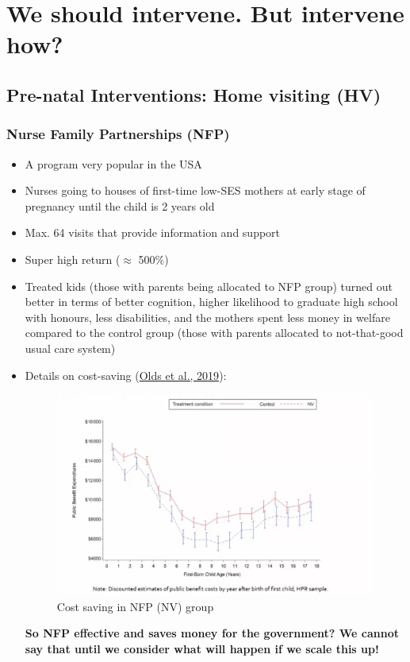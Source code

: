 \section{We should intervene. But intervene how?}

    \subsection{Pre-natal Interventions: Home visiting (HV)}
    
        \subsubsection{Nurse Family Partnerships (NFP)}
        
            \begin{itemize}
                \item A program very popular in the USA
                \item Nurses going to houses of first-time low-SES mothers at early stage of pregnancy until the child is 2 years old
                \item Max. 64 visits that provide information and support
                \item Super high return ($\approx$ 500\%)
                \item Treated kids (those with parents being allocated to NFP group) turned out better in terms of better cognition, higher likelihood to graduate high school with honours, less disabilities, and the mothers spent less money in welfare compared to the control group (those with parents allocated to not-that-good usual care system)
                \item Details on cost-saving (\href{https://publications.aap.org/pediatrics/article/144/6/e20183889/77004/Prenatal-and-Infancy-Nurse-Home-Visiting-Effects}{Olds et al., 2019}):
                \begin{figure}[H]%
                    \centering
                    \includegraphics[width=13cm]{images/ch4/NFP cost saving.png}
                    \caption{Cost saving in NFP (NV) group}
                    \label{Prebirthgradient}
                \end{figure}
                \textbf{So NFP effective and saves money for the government? We cannot say that until we consider what will happen if we scale this up!}
            \end{itemize}
            
